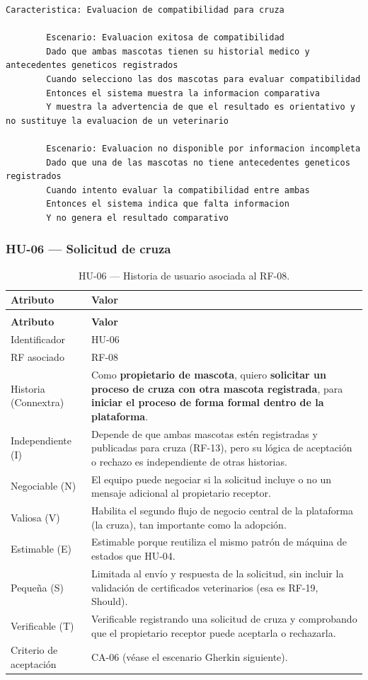 \documentclass[journal,onecolumn]{IEEEtran}
\makeatletter
\newenvironment{atributos}[2]{%
	\small
	\begin{longtable}{@{}>{\raggedright\arraybackslash}p{4.2cm} >{\raggedright\arraybackslash}p{11.2cm}@{}}
		\caption{#2}\label{tab:#1}\\
		\toprule
		\textbf{Atributo} & \textbf{Valor} \\
		\midrule
		\endfirsthead
		\multicolumn{2}{@{}l}{\small\itshape (continuación)}\\
		\toprule
		\textbf{Atributo} & \textbf{Valor} \\
		\midrule
		\endhead
		\bottomrule
		\endlastfoot
	}{%
	\end{longtable}
	\normalsize
}
\makeatother
\begin{document}
	\begin{lstlisting}[style=gherkin,caption={CA-05 --- Escenario de aceptación de la historia HU-05.},label={lst:ca05}]
		Caracteristica: Evaluacion de compatibilidad para cruza
		
		Escenario: Evaluacion exitosa de compatibilidad
		Dado que ambas mascotas tienen su historial medico y antecedentes geneticos registrados
		Cuando selecciono las dos mascotas para evaluar compatibilidad
		Entonces el sistema muestra la informacion comparativa
		Y muestra la advertencia de que el resultado es orientativo y no sustituye la evaluacion de un veterinario
		
		Escenario: Evaluacion no disponible por informacion incompleta
		Dado que una de las mascotas no tiene antecedentes geneticos registrados
		Cuando intento evaluar la compatibilidad entre ambas
		Entonces el sistema indica que falta informacion
		Y no genera el resultado comparativo
	\end{lstlisting}
	
	\subsubsection{HU-06 --- Solicitud de cruza}
	
	\begin{atributos}{HU-06}{HU-06 --- Historia de usuario asociada al RF-08.}
		Identificador & HU-06 \\
		RF asociado & RF-08 \\
		Historia (Connextra) & Como \textbf{propietario de mascota}, quiero \textbf{solicitar un proceso de cruza con otra mascota registrada}, para \textbf{iniciar el proceso de forma formal dentro de la plataforma}. \\
		Independiente (I) & Depende de que ambas mascotas estén registradas y publicadas para cruza (RF-13), pero su lógica de aceptación o rechazo es independiente de otras historias. \\
		Negociable (N) & El equipo puede negociar si la solicitud incluye o no un mensaje adicional al propietario receptor. \\
		Valiosa (V) & Habilita el segundo flujo de negocio central de la plataforma (la cruza), tan importante como la adopción. \\
		Estimable (E) & Estimable porque reutiliza el mismo patrón de máquina de estados que HU-04. \\
		Pequeña (S) & Limitada al envío y respuesta de la solicitud, sin incluir la validación de certificados veterinarios (esa es RF-19, Should). \\
		Verificable (T) & Verificable registrando una solicitud de cruza y comprobando que el propietario receptor puede aceptarla o rechazarla. \\
		Criterio de aceptación & CA-06 (véase el escenario Gherkin siguiente). \\
	\end{atributos}
	
\end{document}
